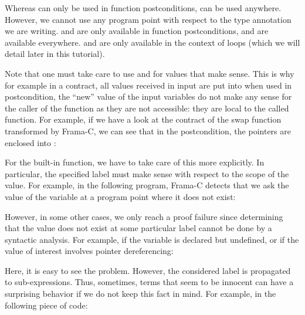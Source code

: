 Whereas  can only be used in function
postconditions,  can be used anywhere.
However, we cannot use any program point with respect to the type
annotation we are writing.  and  are only
available in function postconditions,  and 
are available everywhere.  and 
are only available in the context of loops (which we will detail later
in this tutorial).



Note that one must take care to use  and
 for values that make sense. This is why
for example in a contract, all values received in input are put into
 when used in postcondition, the ``new''
value of the input variables do not make any sense for the caller of the
function as they are not accessible: they are local to the called function.
For example, if we have a look at the contract of the swap function transformed
by Frama-C, we can see that in the postcondition, the pointers are enclosed into
:




For the built-in  function, we have to take care
of this more explicitly. In particular,
the specified label must make sense with respect to the scope of the
value. For example, in the following program, Frama-C detects that we ask
the value of the variable  at a program point where it does
not exist:






However, in some other cases, we only reach a proof failure since determining
that the value does not exist at some particular label cannot be done by
a syntactic analysis. For example, if the variable is declared but undefined,
or if the value of interest involves pointer dereferencing:




Here, it is easy to see the problem. However, the considered label is
propagated to sub-expressions. Thus, sometimes, terms that seem to be
innocent can have a surprising behavior if we do not keep this fact in mind.
For example, in the following piece of code:




